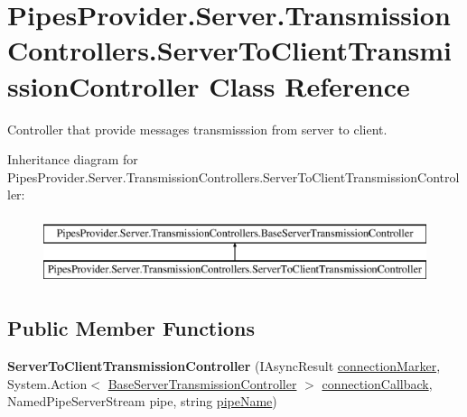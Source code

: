 \hypertarget{class_pipes_provider_1_1_server_1_1_transmission_controllers_1_1_server_to_client_transmission_controller}{}\section{Pipes\+Provider.\+Server.\+Transmission\+Controllers.\+Server\+To\+Client\+Transmission\+Controller Class Reference}
\label{class_pipes_provider_1_1_server_1_1_transmission_controllers_1_1_server_to_client_transmission_controller}


Controller that provide message\textquotesingle{}s transmisssion from server to client.  


Inheritance diagram for Pipes\+Provider.\+Server.\+Transmission\+Controllers.\+Server\+To\+Client\+Transmission\+Controller\+:\begin{figure}[H]
\begin{center}
\leavevmode
\includegraphics[height=2.000000cm]{d5/d4e/class_pipes_provider_1_1_server_1_1_transmission_controllers_1_1_server_to_client_transmission_controller}
\end{center}
\end{figure}
\subsection*{Public Member Functions}
\begin{DoxyCompactItemize}
\item 
\mbox{\label{class_pipes_provider_1_1_server_1_1_transmission_controllers_1_1_server_to_client_transmission_controller_afa5595e45959941c7d3e84e868a25223}} 
{\bfseries Server\+To\+Client\+Transmission\+Controller} (I\+Async\+Result \mbox{\hyperlink{class_pipes_provider_1_1_server_1_1_transmission_controllers_1_1_base_server_transmission_controller_afc45a2287e6fef24892a0aee8aa86f56}{connection\+Marker}}, System.\+Action$<$ \mbox{\hyperlink{class_pipes_provider_1_1_server_1_1_transmission_controllers_1_1_base_server_transmission_controller}{Base\+Server\+Transmission\+Controller}} $>$ \mbox{\hyperlink{class_pipes_provider_1_1_server_1_1_transmission_controllers_1_1_base_server_transmission_controller_a632261255d8dfc87d93445180c6e2c9d}{connection\+Callback}}, Named\+Pipe\+Server\+Stream pipe, string \mbox{\hyperlink{class_pipes_provider_1_1_server_1_1_transmission_controllers_1_1_base_server_transmission_controller_a4ce9911f1ad6814d3e5c9096d9ddde57}{pipe\+Name}})
\end{DoxyCompactItemize}
